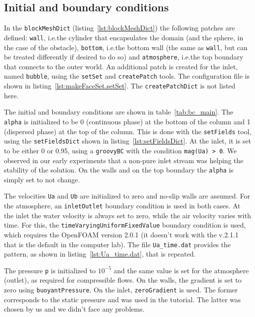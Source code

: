 \documentclass[11pt, a4paper, twoside]{article}
\begin{document}
\subsection{Initial and boundary conditions}
In the \texttt{blockMeshDict} (listing~\ref{lst:blockMeshDict}) the following patches are defined: \texttt{wall}, i.e.\@ the cylinder that encapsulates the domain (and the sphere, in the case of the obstacle), \texttt{bottom}, i.e.\@ the bottom wall (the same as \texttt{wall}, but can be treated differently if desired to do so) and \texttt{atmosphere}, i.e.\@ the top boundary that connects to the outer world. An additional patch is created for the inlet, named \texttt{bubble}, using the \texttt{setSet} and \texttt{createPatch} tools. The configuration file is shown in listing~\ref{lst:makeFaceSet.setSet}. The \texttt{createPatchDict} is not listed here. 

The initial and boundary conditions are shown in table~\ref{tab:bc_main}. The \texttt{alpha} is initialized to be 0 (continuous phase) at the bottom of the column and 1 (dispersed phase) at the top of the column. This is done with the \texttt{setFields} tool, using the \texttt{setFieldsDict} shown in listing~\ref{lst:setFieldsDict}. At the inlet, it is set to be either 0 or 0.95, using a \texttt{groovyBC} with the condition \texttt{mag(Ua) > 0}. We observed in our early experiments that a non-pure inlet stream was helping the stability of the solution. On the walls and on the top boundary the \texttt{alpha} is simply set to not change.

The velocities \texttt{Ua} and \texttt{Ub} are initialized to zero and no-slip walls are assumed. For the atmosphere, an \texttt{inletOutlet} boundary condition is used in both cases. At the inlet the water velocity is always set to zero, while the air velocity varies with time. For this, the \texttt{timeVaryingUniformFixedValue} boundary condition is used, which requires the OpenFOAM version 2.0.1 (it doesn't work with the v.2.1.1 that is the default in the computer lab). The file \texttt{Ua\_time.dat} provides the pattern, as shown in listing~\ref{lst:Ua_time.dat}, that is repeated.

The pressure \texttt{p} is initialized to $10^{-5}$ and the same value is set for the atmosphere (outlet), as required for compressible flows. On the walls, the gradient is set to zero using \texttt{buoyantPressure}. On the inlet, \texttt{zeroGradient} is used. The former corresponds to the static pressure and was used in the tutorial. The latter was chosen by us and we didn't face any problems.
\end{document}
